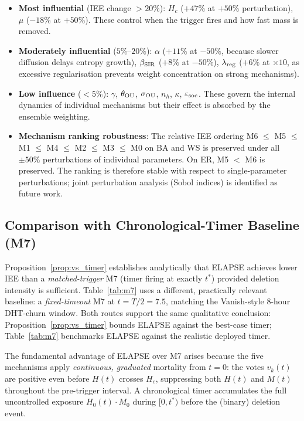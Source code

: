 \documentclass[review,12pt]{elsarticle}
\newcommand{\Hc}{H_c}
\begin{document}
\begin{itemize}
  \item \textbf{Most influential} (IEE change $> 20\%$): $\Hc$ ($+47\%$ at
    $+50\%$ perturbation), $\mu$ ($-18\%$ at $+50\%$).
    These control when the trigger fires and how fast mass is removed.
  \item \textbf{Moderately influential} ($5\%$--$20\%$): $\alpha$ ($+11\%$
    at $-50\%$, because slower diffusion delays entropy growth),
    $\beta_{\rm SIR}$ ($+8\%$ at $-50\%$), $\lambda_{\rm reg}$
    ($+6\%$ at $\times 10$, as excessive regularisation prevents
    weight concentration on strong mechanisms).
  \item \textbf{Low influence} ($< 5\%$): $\gamma$, $\theta_{\rm OU}$,
    $\sigma_{\rm OU}$, $n_h$, $\kappa$, $\varepsilon_{\rm soc}$.
    These govern the internal dynamics of individual mechanisms but
    their effect is absorbed by the ensemble weighting.
  \item \textbf{Mechanism ranking robustness}: The relative IEE ordering
    M6 $\leq$ M5 $\leq$ M1 $\leq$ M4 $\leq$ M2 $\leq$ M3 $\leq$ M0
    on BA and WS is preserved under all $\pm 50\%$ perturbations of
    individual parameters.  On ER, M5 $<$ M6 is preserved.
    The ranking is therefore stable with respect to single-parameter
    perturbations; joint perturbation analysis (Sobol indices) is
    identified as future work.
\end{itemize}

\subsection{Comparison with Chronological-Timer Baseline (M7)}
\label{sec:m7_comparison}

Proposition~\ref{prop:vs_timer} establishes analytically that ELAPSE achieves
lower IEE than a \emph{matched-trigger} M7 (timer firing at exactly $t^*$)
provided deletion intensity is sufficient.
Table~\ref{tab:m7} uses a different, practically relevant baseline: a
\emph{fixed-timeout} M7 at $t = T/2 = 7.5$, matching the Vanish-style
8-hour DHT-churn window.
Both routes support the same qualitative conclusion: Proposition~\ref{prop:vs_timer}
bounds ELAPSE against the best-case timer; Table~\ref{tab:m7} benchmarks
ELAPSE against the realistic deployed timer.

The fundamental advantage of ELAPSE over M7 arises because the five
mechanisms apply \emph{continuous, graduated} mortality from $t=0$: the votes
$v_k(t)$ are positive even before $H(t)$ crosses $\Hc$, suppressing both
$H(t)$ and $M(t)$ throughout the pre-trigger interval.  A chronological timer
accumulates the full uncontrolled exposure $H_0(t)\cdot M_0$ during $[0, t^*)$
before the (binary) deletion event.
\end{document}
